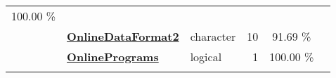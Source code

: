 \documentclass[]{article}
\begin{document}
\begin{longtable}[]{@{}lllrcl@{}}
\begin{minipage}[t]{0.10\columnwidth}
100.00 \%\strut
\end{minipage} & \begin{minipage}[t]{0.12\columnwidth}\raggedright\strut
\strut
\end{minipage}\tabularnewline
\begin{minipage}[t]{0.07\columnwidth}\raggedright\strut
\strut
\end{minipage} & \begin{minipage}[t]{0.35\columnwidth}\raggedright\strut
\textbf{\protect\hyperlink{onlinedataformat2}{OnlineDataFormat2}}\strut
\end{minipage} & \begin{minipage}[t]{0.11\columnwidth}\raggedright\strut
character\strut
\end{minipage} & \begin{minipage}[t]{0.10\columnwidth}\raggedleft\strut
10\strut
\end{minipage} & \begin{minipage}[t]{0.10\columnwidth}\centering\strut
91.69 \%\strut
\end{minipage} & \begin{minipage}[t]{0.12\columnwidth}\raggedright\strut
\strut
\end{minipage}\tabularnewline
\begin{minipage}[t]{0.07\columnwidth}\raggedright\strut
\strut
\end{minipage} & \begin{minipage}[t]{0.35\columnwidth}\raggedright\strut
\textbf{\protect\hyperlink{onlineprograms}{OnlinePrograms}}\strut
\end{minipage} & \begin{minipage}[t]{0.11\columnwidth}\raggedright\strut
logical\strut
\end{minipage} & \begin{minipage}[t]{0.10\columnwidth}\raggedleft\strut
1\strut
\end{minipage} & \begin{minipage}[t]{0.10\columnwidth}\centering\strut
100.00 \%\strut
\end{minipage} & \begin{minipage}[t]{0.12\columnwidth}\raggedright\strut
\strut
\end{minipage}\tabularnewline
\begin{minipage}[t]{0.07\columnwidth}\raggedright\strut
\strut
\end{minipage} & \begin{minipage}[t]{0.35\columnwidth}\raggedright\strut

\end{minipage}
\end{longtable}
\end{document}
